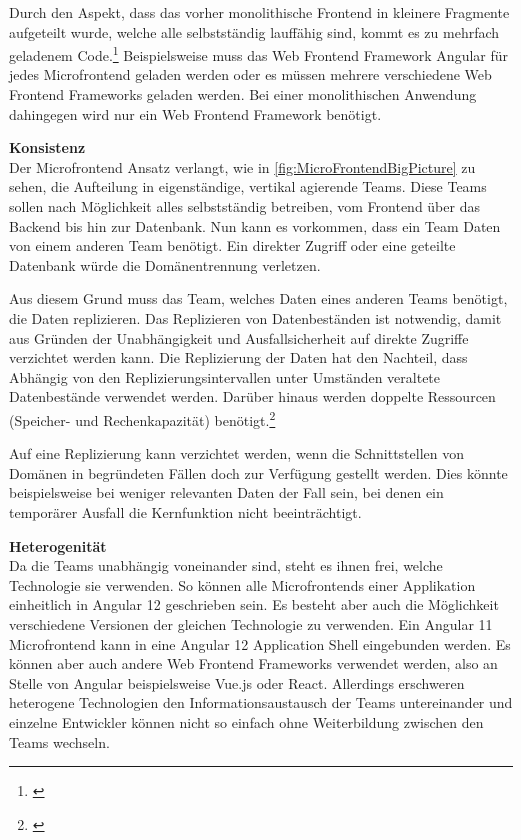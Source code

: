 Durch den Aspekt, dass das vorher monolithische Frontend in kleinere Fragmente aufgeteilt wurde, welche alle selbstständig lauffähig sind, kommt es zu mehrfach geladenem Code.\footnote{\cite[vgl.][19]{Geers2020}} Beispielsweise muss das Web Frontend Framework Angular für jedes Microfrontend geladen werden oder es müssen mehrere verschiedene Web Frontend Frameworks geladen werden. Bei einer monolithischen Anwendung dahingegen wird nur ein Web Frontend Framework benötigt.

\textbf{Konsistenz}\\
Der Microfrontend Ansatz verlangt, wie in \cref{fig:MicroFrontendBigPicture} zu sehen, die Aufteilung in eigenständige, vertikal agierende Teams. Diese Teams sollen nach Möglichkeit alles selbstständig betreiben, vom Frontend über das Backend bis hin zur Datenbank. Nun kann es vorkommen, dass ein Team Daten von einem anderen Team benötigt. Ein direkter Zugriff oder eine geteilte Datenbank würde die Domänentrennung verletzen. 

Aus diesem Grund muss das Team, welches Daten eines anderen Teams benötigt, die Daten replizieren. Das Replizieren von Datenbeständen ist notwendig, damit aus Gründen der Unabhängigkeit und Ausfallsicherheit auf direkte Zugriffe verzichtet werden kann.
Die Replizierung der Daten hat den Nachteil, dass Abhängig von den Replizierungsintervallen unter Umständen veraltete Datenbestände verwendet werden. Darüber hinaus werden doppelte Ressourcen (Speicher- und Rechenkapazität) benötigt.\footnote{\cite[vgl.][18]{Geers2020}} 

Auf eine Replizierung kann verzichtet werden, wenn die Schnittstellen von Domänen in begründeten Fällen doch zur Verfügung gestellt werden. Dies könnte beispielsweise bei weniger relevanten Daten der Fall sein, bei denen ein temporärer Ausfall die Kernfunktion nicht beeinträchtigt.

\textbf{Heterogenität}\\
Da die Teams unabhängig voneinander sind, steht es ihnen frei, welche Technologie sie verwenden. So können alle Microfrontends einer Applikation einheitlich in Angular 12 geschrieben sein. Es besteht aber auch die Möglichkeit verschiedene Versionen der gleichen Technologie zu verwenden. Ein Angular 11 Microfrontend kann in eine Angular 12 Application Shell eingebunden werden. 
Es können aber auch andere Web Frontend Frameworks verwendet werden, also an Stelle von Angular beispielsweise Vue.js oder React. Allerdings erschweren heterogene Technologien den Informationsaustausch der Teams untereinander und einzelne Entwickler können nicht so einfach ohne Weiterbildung zwischen den Teams wechseln. 


